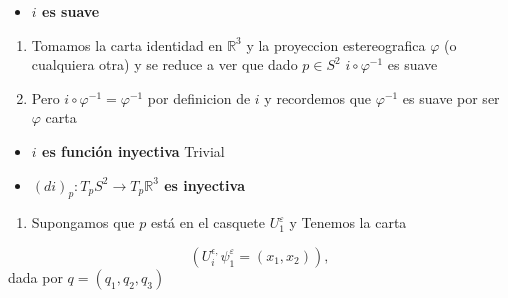 \begin{bookproof}{}
\begin{itemize}
\item \textbf{$i$ es suave}
\end{itemize}
\begin{enumerate}
\item Tomamos la carta identidad en $\mathbb{R}^{3}$ y la proyeccion estereografica $\varphi$ (o cualquiera otra) y se reduce a ver que dado $p\in S^{2}$ $i\circ\varphi ^{-1}$ es suave
\item Pero $i\circ\varphi ^{-1}=\varphi ^{-1}$ por definicion de $i$ y recordemos que $\varphi ^{-1}$ es suave por ser $\varphi$ carta
\end{enumerate}
\begin{itemize}
\item \textbf{$i$ es función inyectiva} Trivial
\item \textbf{$(di)_p:T_pS^2\to T_p\mathbb R^3$ es inyectiva}
\end{itemize}
\begin{enumerate}
\item Supongamos que $p$ está en el casquete $U_1^\varepsilon$ y Tenemos la carta
\end{enumerate}
\[
(U_{i}^{\epsilon,} \psi_1^\varepsilon=(x_1,x_2)),
\]
dada por $q=(q_{1},q_{2},q_{3})$


\end{bookproof}
